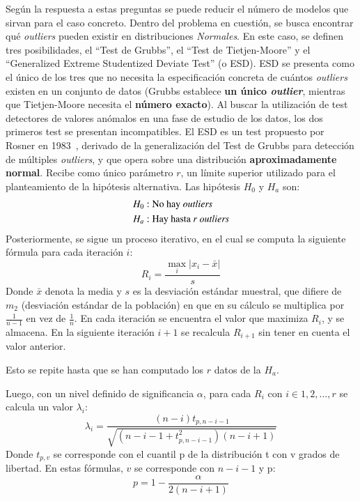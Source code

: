 Según la respuesta a estas preguntas se puede reducir el número de modelos que sirvan para el caso 
concreto. Dentro del problema en cuestión, se busca encontrar qué \textit{outliers} pueden existir en 
distribuciones \textit{Normales}. En este caso, se definen tres posibilidades, el \enquote{Test de Grubbs},
el \enquote{Test de Tietjen-Moore} y el \enquote{Generalized Extreme Studentized Deviate Test} (o ESD). ESD
se presenta como el único de los tres que no necesita la especificación concreta de cuántos \textit{outliers} existen 
en un conjunto de datos (Grubbs establece \textbf{un único \textit{outlier}}, mientras que Tietjen-Moore 
necesita el \textbf{número exacto}). Al buscar la utilización de test detectores de valores anómalos en 
una fase de estudio de los datos, los dos primeros test se presentan incompatibles.
El ESD es un test propuesto por Rosner en 1983~\cite{rosner1983}, derivado de la generalización del Test de Grubbs para 
detección de múltiples \textit{outliers}, y que opera sobre una distribución \textbf{aproximadamente normal}.
Recibe como único parámetro $r$, un límite superior utilizado para el planteamiento de la
hipótesis alternativa. Las hipótesis \(H_0\) y \(H_a\) son:
\[
\begin{aligned}
H_0 &: \text{No hay \textit{outliers}} \\
H_a &: \text{Hay hasta } r~\textit{outliers}
\end{aligned}
\]
Posteriormente, se sigue un proceso iterativo, en el cual se computa la siguiente fórmula para cada 
iteración $i$:
\begin{equation}
R_i = \frac {\max_i{\left|x_i-\bar{x}\right|}}{s}
\end{equation}
Donde $\bar{x}$ denota la media y $s$ es la desviación estándar muestral, 
que difiere de $m_2$ (desviación estándar de la población) en que en su cálculo se 
multiplica por $\frac {1} {n - 1}$ en vez de $\frac {1} {n}$.
En cada iteración se encuentra el valor que maximiza $R_i$, y se almacena. En la siguiente 
iteración $i+1$ se recalcula $R_{i+1}$ sin tener en cuenta el valor anterior.

Esto se repite hasta que se han computado los $r$ datos de la $H_a$.

Luego, con un nivel definido de significancia $\alpha$, para cada $R_i$ con $i \in 1,2,\ldots, r$ 
se calcula un valor $\lambda_i$:
\begin{equation}
\lambda_i = \frac {\left ( n - i \right ) t_{p, n-i-1}} {\sqrt{\left ( n- i -1 + t_{p, n-i-1}^{2} \right ) \left ( n -i +1 \right )}}
\end{equation}
Donde $t_{p,v}$ se corresponde con el cuantil p de la distribución t con 
v grados de libertad. En estas fórmulas, $v$ se corresponde con $n-i-1$ y p:
\begin{equation}
p = 1 - \frac {\alpha} {2 \left ( n - i + 1 \right )}
\end{equation}



